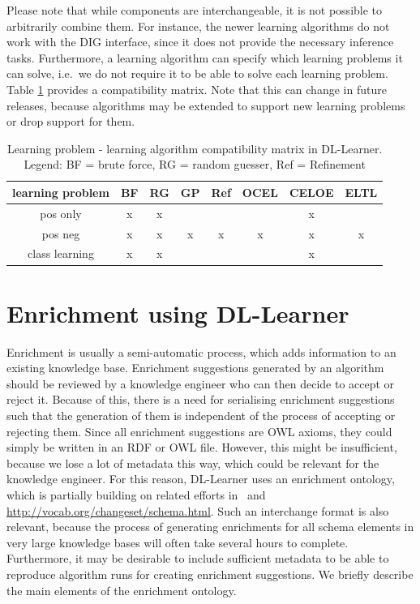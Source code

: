 \documentclass[a4paper,12pt]{scrartcl}
\begin{document}
Please note that while components are interchangeable, it is not possible to arbitrarily combine them. For instance, the newer learning algorithms do not work with the DIG interface, since it does not provide the necessary inference tasks. Furthermore, a learning algorithm can specify which learning problems it can solve, i.e.~we do not require it to be able to solve each learning problem. Table \ref{tab:la_lp_comp} provides a compatibility matrix. Note that this can change in future releases, because algorithms may be extended to support new learning problems or drop support for them.

\begin{table}[htb]
\centering
\begin{tabular}{c|ccccccc}
learning problem & BF & RG & GP & Ref & OCEL & CELOE & ELTL \\\hline
pos only & x & x & & & & x & \\
pos neg & x & x & x & x & x & x & x  \\
class learning & x & x & & & & x &
\end{tabular}
\caption{Learning problem - learning algorithm compatibility matrix in DL-Learner. Legend: BF = brute force, RG = random guesser, Ref = Refinement}
\label{tab:la_lp_comp}
\end{table}

\section{Enrichment using DL-Learner}

Enrichment is usually a semi-automatic process, which adds information to an existing knowledge base.
Enrichment suggestions generated by an algorithm should be reviewed by a knowledge engineer who can then decide to accept or reject it.
Because of this, there is a need for serialising enrichment suggestions such that the generation of them is independent of the process of accepting or rejecting them.
Since all enrichment suggestions are OWL axioms, they could simply be written in an RDF or OWL file.
However, this might be insufficient, because we lose a lot of metadata this way, which could be relevant for the knowledge engineer. 
For this reason, DL-Learner uses an enrichment ontology, which is partially building on related efforts in~\cite{ontchange} and \url{http://vocab.org/changeset/schema.html}. 
Such an interchange format is also relevant, because the process of generating enrichments for all schema elements in very large knowledge bases will often take several hours to complete.
Furthermore, it may be desirable to include sufficient metadata to be able to reproduce algorithm runs for creating enrichment suggestions.
We briefly describe the main elements of the enrichment ontology.
\end{document}
